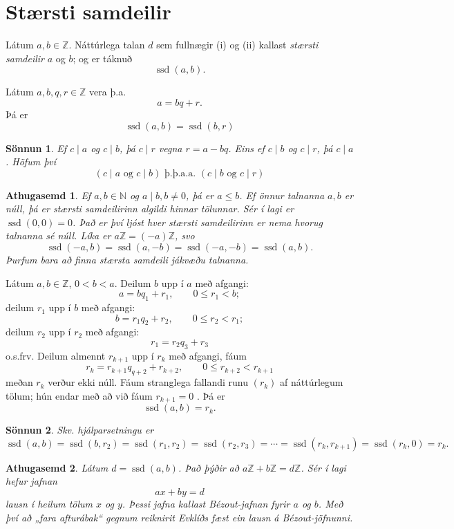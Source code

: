 \documentclass[a4paper,icelandic,11pt]{book}
\theoremstyle{plain}
\newtheorem*{ath}{Athugasemd}
\newtheorem*{sonnun}{Sönnun}
\newcommand{\N}{\mathbb{N}}
\newcommand{\Z}{\mathbb{Z}}
\DeclareMathOperator{\ssd}{ssd} %
\begin{document}
\section{Stærsti samdeilir}
\begin{skilgr}
  Látum $a,b\in\Z$. Náttúrlega talan $d$ sem fullnægir (i) og (ii) kallast
  \emph{stærsti samdeilir} $a$ og $b$; og er táknuð
  \[ \ssd (a,b) .\]
\end{skilgr}


\begin{hjalparsetn}
  Látum $a,b,q,r \in\Z$ vera þ.a.
  \[ a = bq + r .\]
  Þá er
  \[ \ssd (a,b) = \ssd (b,r) \]
\end{hjalparsetn}
\begin{sonnun}
  Ef $c\mid a$ og $c\mid b$, þá $c\mid r$ vegna $ r = a - bq $. Eins ef $c\mid
  b$ og $c\mid r$, þá
  $c\mid a$. Höfum því
  \[ (c\mid a \text{ og } c\mid b) \text{ þ.þ.a.a. } (c\mid b \text { og } c\mid r) \]
\end{sonnun}
\begin{ath}
  Ef $a,b \in \N$ og $a\mid b,b\neq 0$, þá er $a\le b$. Ef önnur talnanna $a,b$
  er núll, þá er stærsti samdeilirinn algildi hinnar tölunnar. Sér í lagi er
  $\ssd (0,0) = 0$. Það er því ljóst hver stærsti samdeilirinn er nema hvorug
  talnanna sé núll. Líka er $a\Z = (-a) \Z$, svo
  \[ \ssd (-a,b) = \ssd(a,-b) = \ssd(-a,-b) = \ssd(a,b) . \]
  Þurfum bara að finna stærsta samdeili \emph{jákvæðu} talnanna.
\end{ath}
\begin{setn}
  Látum $a,b \in \Z$, $0 < b < a$. Deilum $b$ upp í $a$ með afgangi:
\[ a = bq_1 + r_1, \qquad 0 \le r_1 < b; \]
deilum $r_1$ upp í $b$ með afgangi:
\[ b = r_1 q_2 + r_2, \qquad 0\le r_2 < r_1 ; \]
deilum $r_2$ upp í $r_2$ með afgangi:
\[ r_1 = r_2 q_3 + r_3 \]
o.s.frv. Deilum almennt $r_{k+1}$  upp í $r_k$ með afgangi, fáum
\[r_k = r_{k+1} q_{q+2} + r_{k+2}, \qquad 0\le r_{k+2} < r_{k+1} \]
meðan $r_k$ verður ekki núll. Fáum stranglega fallandi runu $(r_k)$ af
náttúrlegum tölum; hún endar með að við fáum $r_{k+1} = 0$ . Þá er
\[ \ssd (a,b) = r_k . \]
\end{setn}
\begin{sonnun}
  Skv. hjálparsetningu er
  \[ \ssd(a,b) = \ssd(b,r_2) = \ssd(r_1,r_2) = \ssd(r_2,r_3) =\cdots =
  \ssd(r_k,r_{k+1}) =\ssd(r_k,0) = r_k.\]
\end{sonnun}
\begin{ath}
  Látum $d=\ssd(a,b)$. Það þýðir að $a\Z + b\Z = d\Z$. Sér í lagi hefur jafnan
  \[ ax + by = d \]
  lausn í heilum tölum $x$ og $y$. Þessi jafna kallast
  \emph{Bézout-jafnan}
  fyrir $a$ og $b$. Með því að „fara afturábak“ gegnum reiknirit Evklíðs fæst
  \emph{ein} lausn á Bézout-jöfnunni.
\end{ath}
\end{document}
